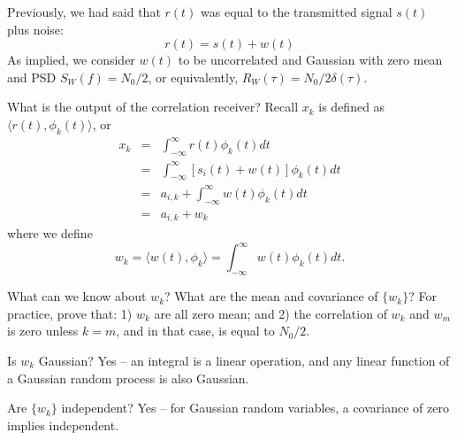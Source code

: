 Previously, we had said that $r(t)$ was equal to the transmitted signal $s(t)$ plus noise:
\[
 r(t) = s(t) + w(t)
\]
As implied, we consider $w(t)$ to be uncorrelated and Gaussian with zero mean and PSD $S_W(f) = N_0/2$, or equivalently, $R_W(\tau) = N_0/2 \delta(\tau)$.  

What is the output of the correlation receiver?  Recall $x_k$ is defined as $\langle r(t), \phi_k(t) \rangle$, or
\begin{eqnarray}
  x_k &=& \int_{-\infty}^\infty r(t) \phi_k(t) dt
      \nonumber \\
    &=& \int_{-\infty}^\infty [s_i(t) + w(t)] \phi_k(t) dt
      \nonumber \\
    &=& a_{i,k} + \int_{-\infty}^\infty w(t) \phi_k(t) dt
      \nonumber \\
    &=& a_{i,k} + w_k
      \nonumber
\end{eqnarray}
where we define
\[
 w_k = \langle w(t), \phi_k \rangle = \int_{-\infty}^\infty w(t) \phi_k(t) dt.
\]

What can we know about $w_k$?  What are the mean and covariance of $\{w_k\}$?  For practice, prove that: 1) $w_k$ are all zero mean; and 2) the correlation of $w_k$ and $w_m$ is zero unless $k=m$, and in that case, is equal to $N_0/2$.  


Is $w_k$ Gaussian?  Yes -- an integral is a linear operation, and any linear function of a Gaussian random process is also Gaussian.  

Are $\{w_k\}$ independent?  Yes -- for Gaussian random variables, a covariance of zero implies independent.  

